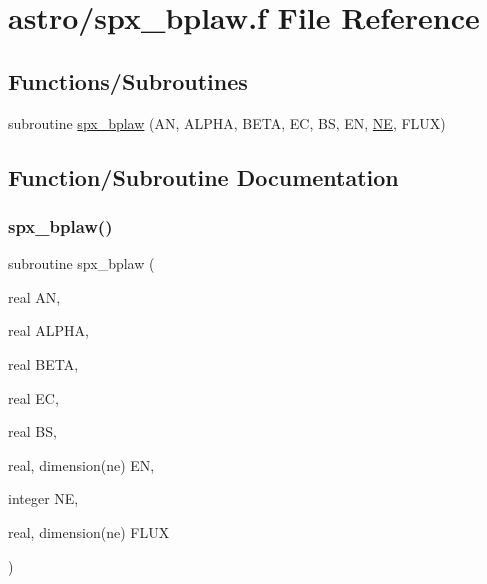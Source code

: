 \hypertarget{spx__bplaw_8f}{}\section{astro/spx\+\_\+bplaw.f File Reference}
\label{spx__bplaw_8f}
\subsection*{Functions/\+Subroutines}
\begin{DoxyCompactItemize}
\item 
subroutine \hyperlink{spx__bplaw_8f_a2ae0a2397dfeec2035a2db0c1c8989b7}{spx\+\_\+bplaw} (AN, A\+L\+P\+HA, B\+E\+TA, EC, BS, EN, \hyperlink{eval__tab_8h_a5af9139e882aef6c820ae908589a40d6}{NE}, F\+L\+UX)
\end{DoxyCompactItemize}


\subsection{Function/\+Subroutine Documentation}
\mbox{\label{spx__bplaw_8f_a2ae0a2397dfeec2035a2db0c1c8989b7}} 
\subsubsection{\texorpdfstring{spx\+\_\+bplaw()}{spx\_bplaw()}}
{\footnotesize\ttfamily subroutine spx\+\_\+bplaw (\begin{DoxyParamCaption}\item[{real}]{AN,  }\item[{real}]{A\+L\+P\+HA,  }\item[{real}]{B\+E\+TA,  }\item[{real}]{EC,  }\item[{real}]{BS,  }\item[{real, dimension(ne)}]{EN,  }\item[{integer}]{NE,  }\item[{real, dimension(ne)}]{F\+L\+UX }\end{DoxyParamCaption})}

